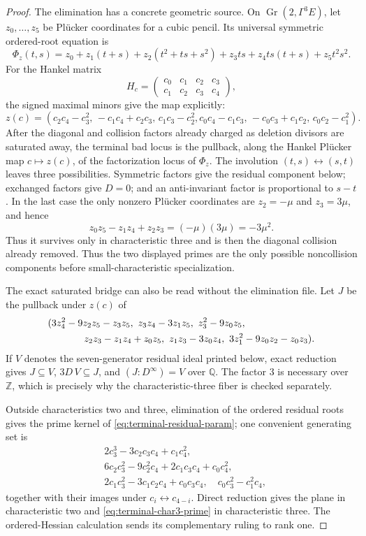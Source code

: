 \begin{proof}
The elimination has a concrete geometric source.  On
\(\operatorname{Gr}(2,\Gamma^3E)\), let \(z_0,\ldots,z_5\) be Plücker
coordinates for a cubic pencil.  Its universal symmetric ordered-root
equation is
\[
 \Phi_z(t,s)=z_0+z_1(t+s)+z_2(t^2+ts+s^2)+z_3ts
              +z_4ts(t+s)+z_5t^2s^2.
\]
For the Hankel matrix
\[
 H_c=\begin{pmatrix}c_0&c_1&c_2&c_3\\c_1&c_2&c_3&c_4\end{pmatrix},
\]
the signed maximal minors give the map explicitly:
\[
 z(c)=(c_2c_4-c_3^2,\,-c_1c_4+c_2c_3,\,c_1c_3-c_2^2,
 c_0c_4-c_1c_3,\,-c_0c_3+c_1c_2,\,c_0c_2-c_1^2).
\]
After the diagonal and collision factors already charged as deletion
divisors are saturated away, the terminal bad locus is the pullback, along
the Hankel Plücker map \(c\mapsto z(c)\), of the factorization locus of
\(\Phi_z\).  The involution \((t,s)\leftrightarrow(s,t)\) leaves three
possibilities.  Symmetric factors give the residual component below;
exchanged factors give \(D=0\); and an anti-invariant factor is proportional
to \(s-t\).  In the last case the only nonzero Plücker coordinates are
\(z_2=-\mu\) and \(z_3=3\mu\), and hence
\[
 z_0z_5-z_1z_4+z_2z_3=(-\mu)(3\mu)=-3\mu^2.
\]
Thus it
survives only in characteristic three and is then the diagonal collision
already removed.  Thus the two displayed primes are the only possible
noncollision components before small-characteristic specialization.

The exact saturated bridge can also be read without the elimination file.
Let \(J\) be the pullback under \(z(c)\) of
\[
\begin{split}
&(3z_4^2-9z_2z_5-z_3z_5,\ z_3z_4-3z_1z_5,\
z_3^2-9z_0z_5,\\
&\hspace{13mm}z_2z_3-z_1z_4+z_0z_5,\ z_1z_3-3z_0z_4,\
3z_1^2-9z_0z_2-z_0z_3).
\end{split}
\]
If \(V\) denotes the seven-generator residual ideal printed below, exact
reduction gives \(J\subseteq V\), \(3D\,V\subseteq J\), and
\((J:D^\infty)=V\) over \(\mathbb Q\).  The factor \(3\) is necessary over
\(\mathbb Z\), which is precisely why the characteristic-three fiber is
checked separately.

Outside characteristics two and three, elimination of the ordered residual
roots gives the prime kernel of \eqref{eq:terminal-residual-param}; one
convenient generating set is
\begin{align*}
&2c_3^3-3c_2c_3c_4+c_1c_4^2,\\
&6c_2c_3^2-9c_2^2c_4+2c_1c_3c_4+c_0c_4^2,\\
&2c_1c_3^2-3c_1c_2c_4+c_0c_3c_4,\quad
  c_0c_3^2-c_1^2c_4,
\end{align*}
together with their images under \(c_i\leftrightarrow c_{4-i}\).  Direct
reduction gives the plane in characteristic two and
\eqref{eq:terminal-char3-prime} in characteristic
three.  The ordered-Hessian calculation sends its complementary ruling to
rank one.


\end{proof}
